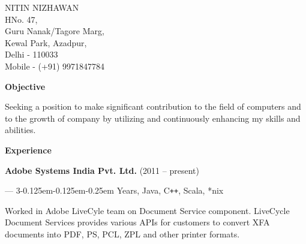 \documentclass{article}
\begin{document}
\newcommand{\myhalf}{\kern-0.125em{\thinspace\tiny\raisebox{0.5em}{1}\kern-0.125em\raisebox{0.25em}{/}\kern-0.25em\raisebox{-0.1em}{2}}}
  \begin{flushright}
{\LARGE NITIN NIZHAWAN}\\[11pt]
HNo. 47,\\
Guru Nanak/Tagore Marg,\\
Kewal Park, Azadpur,\\
Delhi - 110033\\
Mobile - (+91) 9971847784
  \end{flushright}
\hrulefill

\begin{flushleft} {\large\bf Objective}
\end{flushleft}

Seeking a position to make significant contribution to the field of computers and to the growth of company by utilizing and continuously enhancing my skills and abilities.
\begin{flushleft}
\large\bf{Experience}
\end{flushleft}

\begin{center}
   {\bf Adobe Systems India Pvt. Ltd.} (2011 -- present)\\
\end{center}
\begin{flushright} --- 3\myhalf{} Years, Java, C{}\verb!++!, Scala, *nix \end{flushright}
   Worked in Adobe LiveCyle team on Document Service component. LiveCycle Document Services provides various APIs for customers to convert XFA documents into PDF, PS, PCL, ZPL and other printer formats.\\
   
\end{document}
